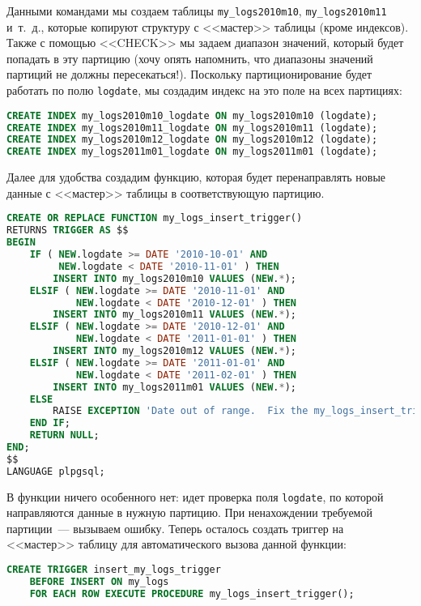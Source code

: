 Данными командами мы создаем таблицы \lstinline!my_logs2010m10!, \lstinline!my_logs2010m11! и~т.~д., которые копируют структуру с <<мастер>> таблицы (кроме индексов). Также с помощью <<CHECK>> мы задаем диапазон значений, который будет попадать в эту партицию (хочу опять напомнить, что диапазоны значений партиций не должны пересекаться!). Поскольку партиционирование будет работать по полю \lstinline!logdate!, мы создадим индекс на это поле на всех партициях:

\begin{lstlisting}[language=SQL,label=lst:partitioning4,caption=Создание индексов]
CREATE INDEX my_logs2010m10_logdate ON my_logs2010m10 (logdate);
CREATE INDEX my_logs2010m11_logdate ON my_logs2010m11 (logdate);
CREATE INDEX my_logs2010m12_logdate ON my_logs2010m12 (logdate);
CREATE INDEX my_logs2011m01_logdate ON my_logs2011m01 (logdate);
\end{lstlisting}

Далее для удобства создадим функцию, которая будет перенаправлять новые данные с <<мастер>> таблицы в соответствующую партицию.

\begin{lstlisting}[language=SQL,label=lst:partitioning5,caption=Функция для перенаправления]
CREATE OR REPLACE FUNCTION my_logs_insert_trigger()
RETURNS TRIGGER AS $$
BEGIN
    IF ( NEW.logdate >= DATE '2010-10-01' AND
         NEW.logdate < DATE '2010-11-01' ) THEN
        INSERT INTO my_logs2010m10 VALUES (NEW.*);
    ELSIF ( NEW.logdate >= DATE '2010-11-01' AND
            NEW.logdate < DATE '2010-12-01' ) THEN
        INSERT INTO my_logs2010m11 VALUES (NEW.*);
    ELSIF ( NEW.logdate >= DATE '2010-12-01' AND
            NEW.logdate < DATE '2011-01-01' ) THEN
        INSERT INTO my_logs2010m12 VALUES (NEW.*);
    ELSIF ( NEW.logdate >= DATE '2011-01-01' AND
            NEW.logdate < DATE '2011-02-01' ) THEN
        INSERT INTO my_logs2011m01 VALUES (NEW.*);
    ELSE
        RAISE EXCEPTION 'Date out of range.  Fix the my_logs_insert_trigger() function!';
    END IF;
    RETURN NULL;
END;
$$
LANGUAGE plpgsql;
\end{lstlisting}

В функции ничего особенного нет: идет проверка поля \lstinline!logdate!, по которой направляются данные в нужную партицию. При ненахождении требуемой партиции~--- вызываем ошибку. Теперь осталось создать триггер на <<мастер>> таблицу для автоматического вызова данной функции:

\begin{lstlisting}[language=SQL,label=lst:partitioning6,caption=Триггер]
CREATE TRIGGER insert_my_logs_trigger
    BEFORE INSERT ON my_logs
    FOR EACH ROW EXECUTE PROCEDURE my_logs_insert_trigger();
\end{lstlisting}

